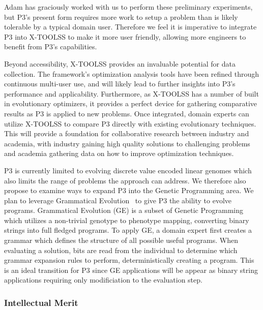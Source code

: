 \documentclass{article}
\newcommand{\includegraphicsfit}[1]
{\texttt{[image: \#1]}}
\begin{document}
Adam has graciously worked with us to perform these preliminary
experiments, but P3's present form requires more work to setup a
problem than is likely tolerable by a typical domain user. 
Therefore we feel it is imperative to integrate P3 into X-TOOLSS to make it more user friendly,
allowing more engineers to benefit from P3's capabilities.

Beyond accessibility, X-TOOLSS provides an invaluable potential for data collection.
The framework's optimization analysis tools have been refined through continuous multi-user use, and
will likely lead to further insights into P3's performance and applicability.  Furthermore, as X-TOOLSS has a number
of built in evolutionary optimizers, it provides a perfect device for gathering comparative results
as P3 is applied to new problems.  Once integrated, domain experts can utilize
X-TOOLSS to compare P3 directly with existing evolutionary techniques.
This will provide a foundation
for collaborative research between industry and academia, with industry gaining high quality solutions
to challenging problems and academia gathering data on how to improve optimization techniques.


P3 is currently limited to evolving discrete value encoded linear
genomes which also limits the range of problems the approach can address.
We therefore also propose to examine ways to expand P3 into the
Genetic Programming area. We plan to leverage Grammatical Evolution~\cite{oneill:2001:grammatical}
to give P3 the ability to evolve programs.  Grammatical Evolution (GE) is a subset
of Genetic Programming which utilizes a non-trivial genotype to phenotype mapping, converting
binary strings into full fledged programs.  To apply GE, a domain expert first creates a
grammar which defines the structure of all possible useful programs.  When evaluating a
solution, bits are read from the individual to determine which grammar expansion rules to perform,
deterministically creating a program.  This is an ideal transition for
P3 since GE applications will be appear as binary string
applications requiring 
only modificiation to the evaluation step.

\vspace{-2.5mm}
\subsubsection*{Intellectual Merit}
\end{document}
